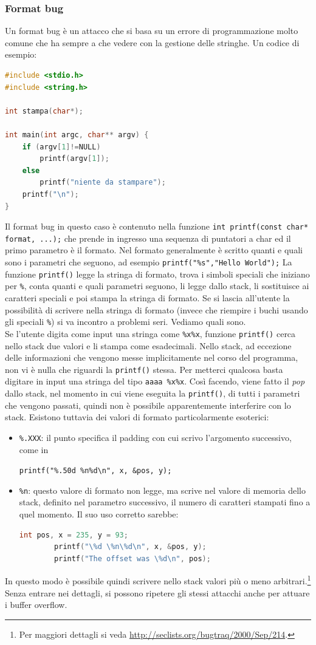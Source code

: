 \subsubsection{Format bug}
Un format bug è un attacco che si basa su un errore di programmazione molto comune che ha sempre a che vedere con la gestione delle stringhe. Un codice di esempio:
\begin{lstlisting}[language=C]
#include <stdio.h>
#include <string.h>

int stampa(char*);

int main(int argc, char** argv) {
	if (argv[1]!=NULL)
		printf(argv[1]);
	else
		printf("niente da stampare");
	printf("\n");
}
\end{lstlisting}
Il format bug in questo caso è contenuto nella funzione \texttt{int printf(const char* format, ...);} che prende in ingresso una sequenza di puntatori a char ed il primo parametro è il formato. Nel formato generalmente è scritto quanti e quali sono i parametri che seguono, ad esempio \texttt{printf("\%s","Hello World");} La funzione \texttt{printf()} legge la stringa di formato, trova i simboli speciali che iniziano per \texttt{\%}, conta quanti e quali parametri seguono, li legge dallo stack, li sostituisce ai caratteri speciali e poi stampa la stringa di formato. Se si lascia all’utente la possibilità di scrivere nella stringa di formato (invece che riempire i buchi usando gli speciali \texttt{\%}) si va incontro a problemi seri. Vediamo quali sono.\\
Se l'utente digita come input una stringa come \texttt{\%x\%x}, funzione \texttt{printf()} cerca nello stack due valori e li stampa come esadecimali. Nello stack, ad eccezione delle informazioni che vengono messe implicitamente nel corso del programma, non vi è nulla che riguardi la \texttt{printf()} stessa. Per metterci qualcosa basta digitare in input una stringa del tipo \texttt{aaaa \%x\%x}. Così facendo, viene fatto il \textit{pop} dallo stack, nel momento in cui viene eseguita la \texttt{printf()}, di tutti i parametri che vengono passati, quindi non è possibile apparentemente interferire con lo stack. Esistono tuttavia dei valori di formato particolarmente esoterici:
\begin{itemize}
	\item \texttt{\%.XXX}: il punto specifica il padding con cui scrivo l'argomento successivo, come in
	\begin{center}
		\texttt{printf("\%.50d \%n\%d\textbackslash n", x, \&pos, y);}
	\end{center}
	\item \texttt{\%n}: questo valore di formato non legge, ma scrive nel valore di memoria dello stack, definito nel parametro successivo, il numero di caratteri stampati fino a quel momento. Il suo uso corretto sarebbe:
	\begin{lstlisting}[language=C]
		int pos, x = 235, y = 93;
		printf("\%d \%n\%d\n", x, &pos, y);
		printf("The offset was \%d\n", pos);
	\end{lstlisting}
\end{itemize}
In questo modo è possibile quindi scrivere nello stack valori più o meno arbitrari.\footnote{Per maggiori dettagli si veda \url{http://seclists.org/bugtraq/2000/Sep/214}.} Senza entrare nei dettagli, si possono ripetere gli stessi attacchi anche per attuare i buffer overflow.